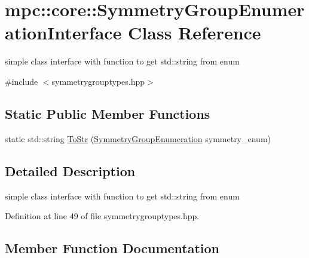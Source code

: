 \hypertarget{structmpc_1_1core_1_1_symmetry_group_enumeration_interface}{}\section{mpc\+:\+:core\+:\+:Symmetry\+Group\+Enumeration\+Interface Class Reference}
\label{structmpc_1_1core_1_1_symmetry_group_enumeration_interface}


simple class interface with function to get std\+::string from enum  




{\ttfamily \#include $<$symmetrygrouptypes.\+hpp$>$}

\subsection*{Static Public Member Functions}
\begin{DoxyCompactItemize}
\item 
static std\+::string \mbox{\hyperlink{structmpc_1_1core_1_1_symmetry_group_enumeration_interface_add5134094062e3da52bb803af93b893c}{To\+Str}} (\mbox{\hyperlink{namespacempc_1_1core_a9d979684062547055a0ef5c13077bad8}{Symmetry\+Group\+Enumeration}} symmetry\+\_\+enum)
\end{DoxyCompactItemize}


\subsection{Detailed Description}
simple class interface with function to get std\+::string from enum 

Definition at line 49 of file symmetrygrouptypes.\+hpp.



\subsection{Member Function Documentation}
\mbox{\label{structmpc_1_1core_1_1_symmetry_group_enumeration_interface_add5134094062e3da52bb803af93b893c}} 
